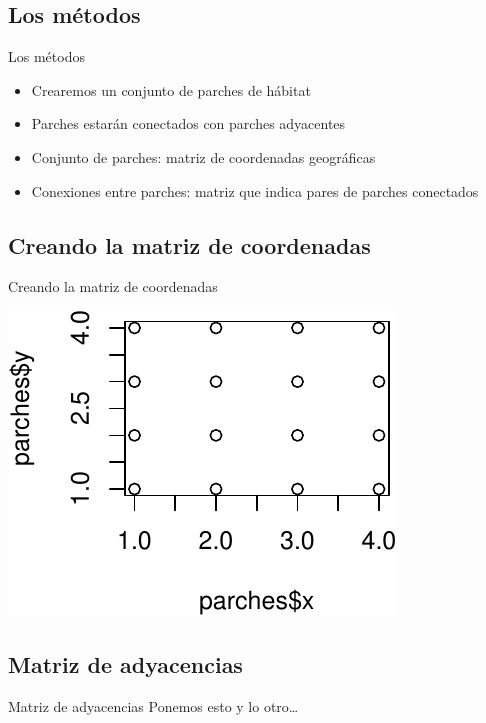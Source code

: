 \documentclass[
  11pt,
  ignorenonframetext,
]{beamer}
\newenvironment{Shaded}{}{}
\newcommand{\AttributeTok}[1]{\textcolor[rgb]{0.49,0.56,0.16}{#1}}
\newcommand{\DecValTok}[1]{\textcolor[rgb]{0.25,0.63,0.44}{#1}}
\newcommand{\FunctionTok}[1]{\textcolor[rgb]{0.02,0.16,0.49}{#1}}
\newcommand{\NormalTok}[1]{#1}
\newcommand{\OtherTok}[1]{\textcolor[rgb]{0.00,0.44,0.13}{#1}}
\newcommand{\SpecialCharTok}[1]{\textcolor[rgb]{0.25,0.44,0.63}{#1}}
\begin{document}
\hypertarget{los-muxe9todos}{%
\subsection{Los métodos}\label{los-muxe9todos}}

\begin{frame}{Los métodos}
\begin{itemize}
\item
  Crearemos un conjunto de parches de hábitat
\item
  Parches estarán conectados con parches adyacentes
\item
  Conjunto de parches: matriz de coordenadas geográficas
\item
  Conexiones entre parches: matriz que indica pares de parches
  conectados
\end{itemize}
\end{frame}

\hypertarget{creando-la-matriz-de-coordenadas}{%
\subsection{Creando la matriz de
coordenadas}\label{creando-la-matriz-de-coordenadas}}

\begin{frame}[fragile]{Creando la matriz de coordenadas}
\begin{Shaded}
\end{Shaded}

\begin{center}\includegraphics{Modelos-islas_files/figure-beamer/unnamed-chunk-3-1} \end{center}
\end{frame}

\hypertarget{matriz-de-adyacencias}{%
\subsection{Matriz de adyacencias}\label{matriz-de-adyacencias}}

\begin{frame}{Matriz de adyacencias}
Ponemos esto y lo otro\ldots{}
\end{frame}
\end{document}
